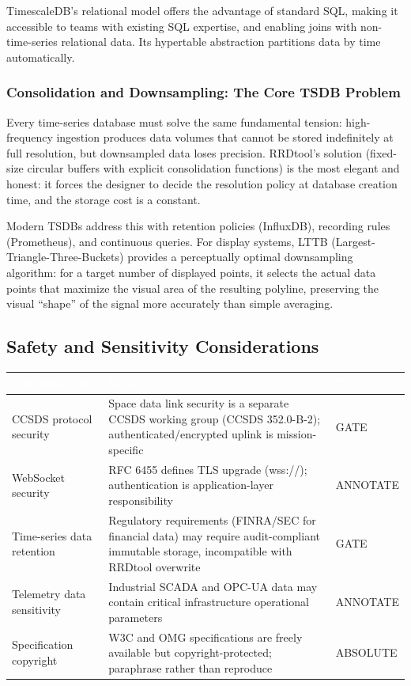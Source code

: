 \documentclass[11pt,letterpaper]{article}
\newcommand{\tableheader}[1]{\textbf{\sffamily\textcolor{white}{#1}}}
\begin{document}
TimescaleDB's relational model offers the advantage of standard SQL, making it accessible to teams with existing SQL expertise, and enabling joins with non-time-series relational data. Its hypertable abstraction partitions data by time automatically.

\subsubsection{Consolidation and Downsampling: The Core TSDB Problem}

Every time-series database must solve the same fundamental tension: high-frequency ingestion produces data volumes that cannot be stored indefinitely at full resolution, but downsampled data loses precision. RRDtool's solution (fixed-size circular buffers with explicit consolidation functions) is the most elegant and honest: it forces the designer to decide the resolution policy at database creation time, and the storage cost is a constant.

Modern TSDBs address this with retention policies (InfluxDB), recording rules (Prometheus), and continuous queries. For display systems, LTTB (Largest-Triangle-Three-Buckets) provides a perceptually optimal downsampling algorithm: for a target number of displayed points, it selects the actual data points that maximize the visual area of the resulting polyline, preserving the visual ``shape'' of the signal more accurately than simple averaging.

\subsection{Safety and Sensitivity Considerations}

\begin{center}
\begin{tabularx}{\textwidth}{L{4cm}XC{2cm}}
\toprule
{}
\tableheader{Consideration} & \tableheader{Detail} & \tableheader{Type} \\
\midrule
CCSDS protocol security & Space data link security is a separate CCSDS working group (CCSDS 352.0-B-2); authenticated/encrypted uplink is mission-specific & GATE \\
WebSocket security & RFC 6455 defines TLS upgrade (wss://); authentication is application-layer responsibility & ANNOTATE \\
Time-series data retention & Regulatory requirements (FINRA/SEC for financial data) may require audit-compliant immutable storage, incompatible with RRDtool overwrite & GATE \\
Telemetry data sensitivity & Industrial SCADA and OPC-UA data may contain critical infrastructure operational parameters & ANNOTATE \\
Specification copyright & W3C and OMG specifications are freely available but copyright-protected; paraphrase rather than reproduce & ABSOLUTE \\
\bottomrule
\end{tabularx}
\end{center}
\end{document}
